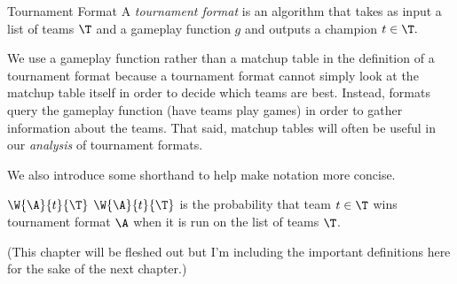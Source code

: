 {

\begin{definition}{Tournament Format}{}
    A \textit{tournament format} is an algorithm that takes as input a list of teams $\T$ and a gameplay function $g$ and outputs a champion $t \in \T.$
\end{definition}

We use a gameplay function rather than a matchup table in the definition of a tournament format because a tournament format cannot simply look at the matchup table itself in order to decide which teams are best. Instead, formats query the gameplay function (have teams play games) in order to gather information about the teams. That said, matchup tables will often be useful in our \textit{analysis} of tournament formats. 

We also introduce some shorthand to help make notation more concise.

\begin{definition}{$\W{\A}{t}{\T}$}{}
    $\W{\A}{t}{\T}$ is the probability that team $t \in \T$ wins tournament format $\A$ when it is run on the list of teams $\T$.
\end{definition}


(This chapter will be fleshed out but I'm including the important definitions here for the sake of the next chapter.)
}